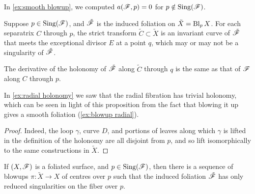 \begin{remark}
    In \cref{ex:smooth blowup}, we computed $a(\mathscr{F},p)=0$ for
    $p\notin\operatorname{Sing}(\mathscr{F})$.
\end{remark}

Suppose $p\in\operatorname{Sing}(\mathscr{F})$, and $\tilde{\mathscr{F}}$ is the induced foliation on
$\tilde X=\operatorname{Bl}_pX$. For each separatrix $C$ through $p$, the strict transform
$\tilde C\subset\tilde X$ is an invariant curve of $\tilde{\mathscr{F}}$ that meets the
exceptional divisor $E$ at a point $q$, which may or may not be a singularity of
$\tilde{\mathscr{F}}$.

\begin{proposition}\label{prop:blowup holonomy}
    The derivative of the holonomy of $\tilde{\mathscr{F}}$ along $\tilde C$ through $q$
    is the same as that of $\mathscr{F}$ along $C$ through $p$.
\end{proposition}

\begin{example}
    In \cref{ex:radial holonomy} we saw that the radial fibration has trivial
    holonomy, which can be seen in light of this proposition from the fact that
    blowing it up gives a smooth foliation (\cref{ex:blowup radial}).
\end{example}

\begin{proof}
    Indeed, the loop $\gamma$, curve $D$, and portions of leaves along which
    $\gamma$ is lifted in the definition of the holonomy are all disjoint from
    $p$, and so lift isomorphically to the same constructions in $\tilde X$.
\end{proof}


\begin{theorem}\label{thm:seidenberg}
    If $(X,\mathscr{F})$ is a foliated surface, and $p\in\operatorname{Sing}(\mathscr{F})$, then there is
    a sequence of blowups $\pi:\tilde X\to X$ of centres over $p$ such that the
    induced foliation $\tilde{\mathscr{F}}$ has only reduced singularities on the fiber
    over $p$.
\end{theorem}

